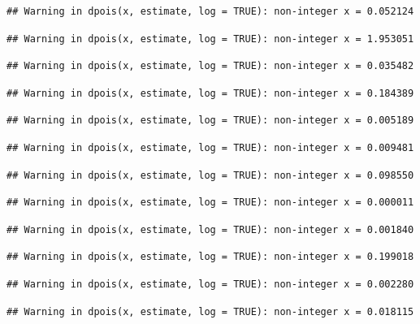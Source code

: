 \documentclass[]{article}
\begin{document}
\begin{verbatim}
## Warning in dpois(x, estimate, log = TRUE): non-integer x = 0.052124
\end{verbatim}

\begin{verbatim}
## Warning in dpois(x, estimate, log = TRUE): non-integer x = 1.953051
\end{verbatim}

\begin{verbatim}
## Warning in dpois(x, estimate, log = TRUE): non-integer x = 0.035482
\end{verbatim}

\begin{verbatim}
## Warning in dpois(x, estimate, log = TRUE): non-integer x = 0.184389
\end{verbatim}

\begin{verbatim}
## Warning in dpois(x, estimate, log = TRUE): non-integer x = 0.005189
\end{verbatim}

\begin{verbatim}
## Warning in dpois(x, estimate, log = TRUE): non-integer x = 0.009481
\end{verbatim}

\begin{verbatim}
## Warning in dpois(x, estimate, log = TRUE): non-integer x = 0.098550
\end{verbatim}

\begin{verbatim}
## Warning in dpois(x, estimate, log = TRUE): non-integer x = 0.000011
\end{verbatim}

\begin{verbatim}
## Warning in dpois(x, estimate, log = TRUE): non-integer x = 0.001840
\end{verbatim}

\begin{verbatim}
## Warning in dpois(x, estimate, log = TRUE): non-integer x = 0.199018
\end{verbatim}

\begin{verbatim}
## Warning in dpois(x, estimate, log = TRUE): non-integer x = 0.002280
\end{verbatim}

\begin{verbatim}
## Warning in dpois(x, estimate, log = TRUE): non-integer x = 0.018115
\end{verbatim}
\end{document}
